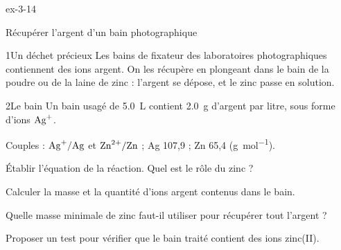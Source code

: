 \begin{blocLivre}{ex-3-14}
\begin{exercice}[3]{Récupérer l'argent d'un bain photographique}
\begin{docu}{1}{Un déchet précieux}
Les bains de fixateur des laboratoires photographiques contiennent des ions argent. On les récupère en plongeant dans le
bain de la poudre ou de la laine de zinc : l'argent se dépose, et le zinc passe en solution.
\end{docu}
\begin{docu}{2}{Le bain}
Un bain usagé de \qty{5,0}{L} contient \qty{2,0}{g} d'argent par litre, sous forme d'ions $\ce{Ag+}$.
\end{docu}
\begin{donnees}
Couples : $\ce{Ag+}/\ce{Ag}$ et $\ce{Zn^{2+}}/\ce{Zn}$ ; Ag 107,9 ; Zn 65,4 (\unit{g.mol^{-1}}).
\end{donnees}
\begin{questions}
\item Établir l'équation de la réaction. Quel est le rôle du zinc ?
\item Calculer la masse et la quantité d'ions argent contenus dans le bain.
\item \initiative Quelle masse minimale de zinc faut-il utiliser pour récupérer tout l'argent ?
\item Proposer un test pour vérifier que le bain traité contient des ions zinc(II).
\end{questions}
\end{exercice}
\end{blocLivre}
